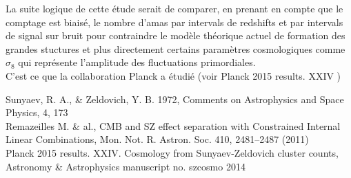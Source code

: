 \documentclass[a4paper,11pt]{article}
\begin{document}
La suite logique de cette étude serait de comparer, en prenant en
compte que le comptage est biaisé, le nombre d'amas par intervals de
redshifts  et par intervals de signal sur bruit pour contraindre le modèle
théorique actuel de formation des grandes stuctures et plus
directement certains paramètres cosmologiques comme $\sigma_8$ qui
représente l'amplitude des fluctuations primordiales.
 \\

C'est ce que la collaboration Planck a étudié (voir Planck 2015
results. XXIV \cite{Planck_SZ}) 

\newpage
\begin{thebibliography}{2}

 Sunyaev, R. A., \& Zeldovich, Y. B. 1972, Comments on
  Astrophysics and Space Physics, 4, 173 \\
  
Remazeilles M. \& al., CMB and SZ effect
  separation with Constrained Internal Linear Combinations, 
  Mon. Not. R. Astron. Soc. 410, 2481–2487 (2011)  \\

 Planck 2015 results. XXIV. Cosmology from Sunyaev-Zeldovich
cluster counts, Astronomy \& Astrophysics manuscript no. szcosmo 2014
\end{thebibliography}

\end{document}
